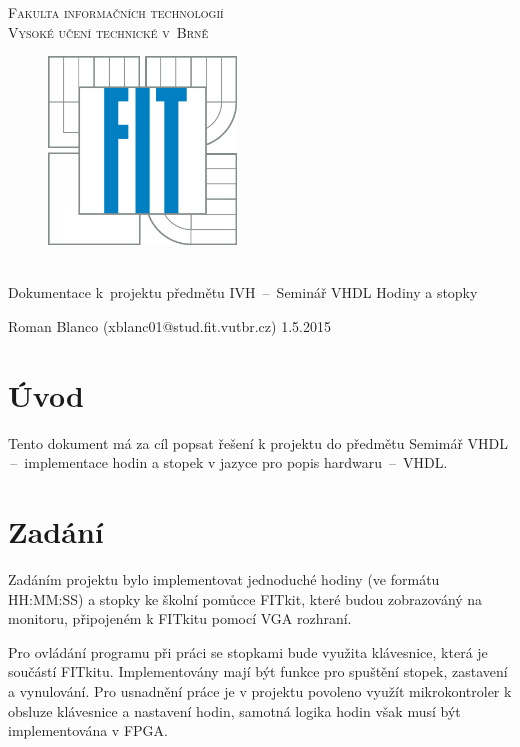 \documentclass[11pt,a4paper]{article}
\begin{document}
  \begin{titlepage}
    \begin{center}
      \Huge
      \textsc{Fakulta informačních technologií\\ Vysoké učení technické v~Brně}
      \vspace{100px}
      \begin{figure}[!h]
        \centering
        \includegraphics[height=5cm]{logo.jpg}
      \end{figure}
      \\[50mm]
      \LARGE{Dokumentace k~projektu předmětu IVH \,--\, Seminář VHDL
             \newline
             Hodiny a stopky}
      \vfill
    \end{center}
    \Large{Roman Blanco (xblanc01@stud.fit.vutbr.cz) \hfill 1.5.2015}
  \end{titlepage}

  \tableofcontents
  \newpage

  \section{Úvod}
 
    Tento dokument má za cíl popsat řešení k projektu do předmětu Semimář
    VHDL \,--\, implementace hodin a stopek v jazyce pro popis
    hardwaru \,--\, VHDL.

  \section{Zadání}
    
    Zadáním projektu bylo implementovat jednoduché hodiny (ve formátu HH:MM:SS) a
    stopky ke školní pomůcce FITkit, které budou zobrazováný na monitoru,
    připojeném k FITkitu pomocí VGA rozhraní.

Pro ovládání programu při práci se stopkami bude využita klávesnice, která je součástí FITkitu.
    Implementovány mají být funkce pro spuštění stopek, zastavení a
    vynulování.
    Pro usnadnění práce je v projektu povoleno využít mikrokontroler k
    obsluze klávesnice a nastavení hodin, samotná logika hodin však musí být
    implementována v FPGA.
\end{document}
